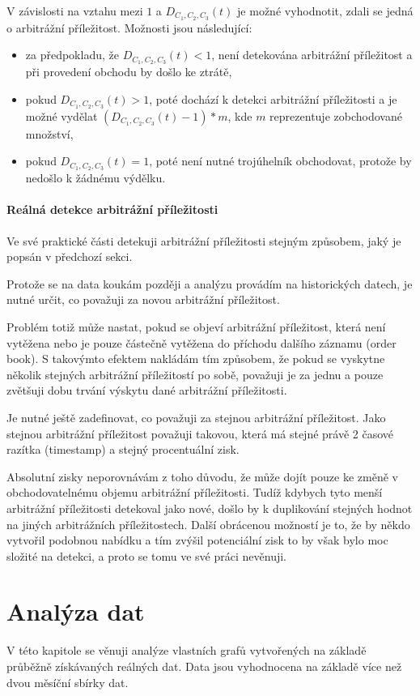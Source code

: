 \documentclass[thesis=B,czech]{FITthesis}[2019/03/21]
\begin{document}
V závislosti na vztahu mezi \(1\) a \(D_{C_1,C_2,C_3}(t)\) je možné vyhodnotit, zdali se jedná o arbitrážní příležitost. Možnosti jsou následující:
\begin{itemize}
    \item za předpokladu, že \(D_{C_1,C_2,C_3}(t) < 1\), není detekována arbitrážní příležitost a při provedení obchodu by došlo ke ztrátě,
    \item pokud \(D_{C_1,C_2,C_3}(t) > 1\), poté dochází k detekci arbitrážní příležitosti a je možné vydělat \( (D_{C_1,C_2,C_3}(t) - 1) * m\), kde \(m\) reprezentuje zobchodované množství,
    \item pokud \(D_{C_1,C_2,C_3}(t) = 1\), poté není nutné trojúhelník obchodovat, protože by nedošlo k žádnému výdělku.
\end{itemize}
\subsubsection{Reálná detekce arbitrážní příležitosti}
Ve své praktické části detekuji arbitrážní příležitosti stejným způsobem, jaký je popsán v předchozí sekci. 

Protože se na data koukám později a analýzu provádím na historických datech, je nutné určit, co považuji za novou arbitrážní příležitost. 

Problém totiž může nastat, pokud se objeví arbitrážní příležitost, která není vytěžena nebo je pouze částečně vytěžena do příchodu dalšího záznamu (order book). S takovýmto efektem nakládám tím způsobem, že pokud se vyskytne několik stejných arbitrážní příležitostí po sobě, považuji je za jednu a pouze zvětšuji dobu trvání výskytu dané arbitrážní příležitosti.

Je nutné ještě zadefinovat, co považuji za stejnou arbitrážní příležitost. Jako stejnou arbitrážní příležitost považuji takovou, která má stejné právě 2 časové razítka (timestamp) a stejný procentuální zisk. 

Absolutní zisky neporovnávám z toho důvodu, že může dojít pouze ke změně v obchodovatelnému objemu arbitrážní příležitosti. Tudíž kdybych tyto menší arbitrážní příležitosti detekoval jako nové, došlo by k duplikování stejných hodnot na jiných arbitrážních příležitostech. Další obrácenou možností je to, že by někdo vytvořil podobnou nabídku a tím zvýšil potenciální zisk to by však bylo moc složité na detekci, a proto se tomu ve své práci nevěnuji. 

\chapter{Analýza dat}
V této kapitole se věnuji analýze vlastních grafů vytvořených na základě průběžně získávaných reálných dat. Data jsou vyhodnocena na základě více než dvou měsíční sbírky dat.
\end{document}
